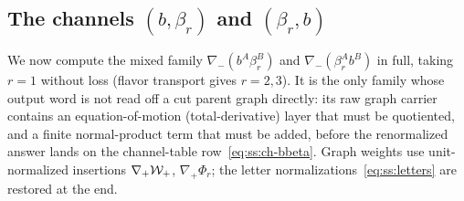 
\subsection{The channels $(b,\beta_r)$ and $(\beta_r,b)$}\label{sec:superspace:ab}

We now compute the mixed family $\nabla_-(b^{A}\beta_r^{B})$ and $\nabla_-(\beta_r^{A}b^{B})$ in full, taking $r=1$ without loss (flavor transport gives $r=2,3$). It is the only family whose output word is not read off a cut parent graph directly: its raw graph carrier contains an equation-of-motion (total-derivative) layer that must be quotiented, and a finite normal-product term that must be added, before the renormalized answer lands on the channel-table row~\eqref{eq:ss:ch-bbeta}. Graph weights use unit-normalized insertions $\nabla_+\mathcal{W}_+$, $\nabla_+\Phi_r$; the letter normalizations~\eqref{eq:ss:letters} are restored at the end.

